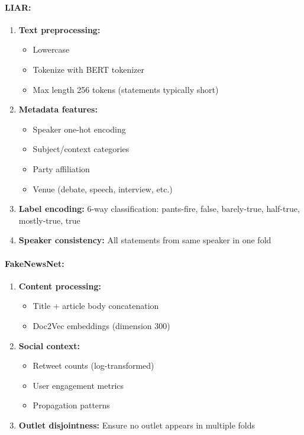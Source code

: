 \documentclass[12pt,a4paper]{article}
\theoremstyle{definition}
\begin{document}
\paragraph{LIAR:}
\begin{enumerate}
\item \textbf{Text preprocessing:}
\begin{itemize}
\item Lowercase
\item Tokenize with BERT tokenizer
\item Max length 256 tokens (statements typically short)
\end{itemize}

\item \textbf{Metadata features:}
\begin{itemize}
\item Speaker one-hot encoding
\item Subject/context categories
\item Party affiliation
\item Venue (debate, speech, interview, etc.)
\end{itemize}

\item \textbf{Label encoding:} 6-way classification: pants-fire, false, barely-true, half-true, mostly-true, true

\item \textbf{Speaker consistency:} All statements from same speaker in one fold
\end{enumerate}

\paragraph{FakeNewsNet:}
\begin{enumerate}
\item \textbf{Content processing:}
\begin{itemize}
\item Title + article body concatenation
\item Doc2Vec embeddings (dimension 300)
\end{itemize}

\item \textbf{Social context:}
\begin{itemize}
\item Retweet counts (log-transformed)
\item User engagement metrics
\item Propagation patterns
\end{itemize}

\item \textbf{Outlet disjointness:} Ensure no outlet appears in multiple folds
\end{enumerate}
\end{document}
